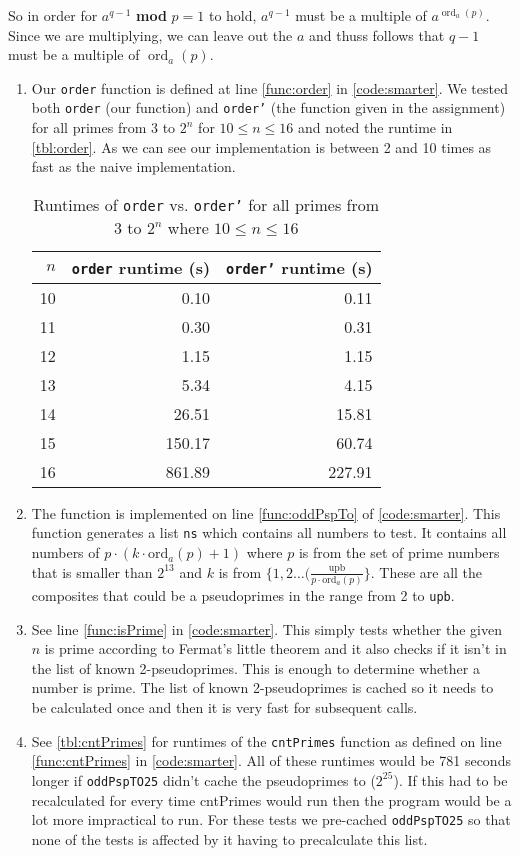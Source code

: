 \documentclass[a4paper]{article}
\DeclareMathOperator*{\ord}{ord}
\begin{document}
So in order for $a^{q-1}$ \textbf{mod} $p=1$ to hold, $a^{q-1}$ must be a multiple of $a^{\ord_a(p)}$. Since we are multiplying, we can leave out the $a$ and thuss follows that $q-1$ must be a multiple of $\ord_a(p)$. 

\begin{enumerate}
	\item Our \texttt{order} function is defined at line \autoref{func:order} in \autoref{code:smarter}. We tested both \texttt{order} (our function) and \texttt{order'} (the function given in the assignment) for all primes from 3 to $2^n$ for $10 \leq n \leq 16$  and noted the runtime in \autoref{tbl:order}. As we can see our implementation is between 2 and 10 times as fast as the naive implementation.
	
\begin{table}[h]
	\centering
	\caption{Runtimes of \texttt{order} vs. \texttt{order'} for all primes from 3 to $2^n$ where $10 \leq n \leq 16$}
	\label{tbl:order}
	\begin{tabular}{r|r|r}
		$n$ & \texttt{order} runtime (s) & \texttt{order'} runtime (s) \\
		\hline
		10 & 0.10 & 0.11 \\
		11 & 0.30 & 0.31 \\
		12 & 1.15 & 1.15 \\
		13 & 5.34 & 4.15 \\
		14 & 26.51 & 15.81 \\
		15 & 150.17 & 60.74 \\
		16 & 861.89 & 227.91
	\end{tabular}
\end{table}
	\item The function is implemented on line \autoref{func:oddPspTo} of \autoref{code:smarter}. This function generates a list \texttt{ns} which contains all numbers to test. It contains all numbers of $p \cdot (k \cdot \text{ord}_a(p) +1)$ where $p$ is from the set of prime numbers that is smaller than $2^13$ and $k$ is from $\{1, 2 \ldots (\frac{\text{upb}}{p \cdot \text{ord}_a(p)} \}$. These are all the composites that could be a pseudoprimes in the range from 2 to \texttt{upb}.
	\item See line \autoref{func:isPrime} in \autoref{code:smarter}. This simply tests whether the given $n$ is prime according to Fermat's little theorem and it also checks if it isn't in the list of known 2-pseudoprimes. This is enough to determine whether a number is prime. The list of known 2-pseudoprimes is cached so it needs to be calculated once and then it is very fast for subsequent calls.
	\item See \autoref{tbl:cntPrimes} for runtimes of the \texttt{cntPrimes} function as defined on line \autoref{func:cntPrimes} in \autoref{code:smarter}. All of these runtimes would be 781 seconds longer if \texttt{oddPspTO25} didn't cache the pseudoprimes to ($2^25$). If this had to be recalculated for every time cntPrimes would run then the program would be a lot more impractical to run. For these tests we pre-cached \texttt{oddPspTO25} so that none of the tests is affected by it having to precalculate this list.


\end{enumerate}
\end{document}
